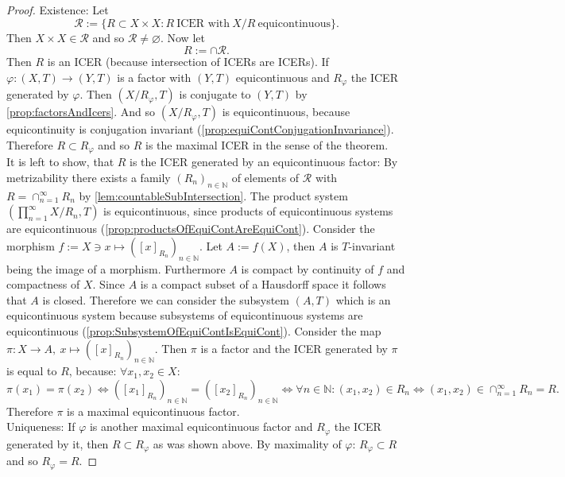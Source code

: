\begin{proof}
  Existence:
  Let
  \begin{equation*}
    \mathcal{R} := \{ R \subset X \times X : R \ \text{ICER with} \ X/R \ \text{equicontinuous}\}.
  \end{equation*}
  Then $ X \times X \in \mathcal{R}$ and so $\mathcal{R} \neq \varnothing$.
    Now let 
  \begin{equation*}
    R:= \cap \mathcal{R}.
  \end{equation*}
  Then $R$ is an ICER (because intersection of ICERs are ICERs).
  If $\varphi : (X,T)\to (Y,T)$ is a factor with $(Y,T)$ equicontinuous and $R_\varphi$ the ICER generated by $\varphi$. Then $(X/R_\varphi,T)$ is conjugate to $(Y,T)$ by \cref{prop:factorsAndIcers}.
  And so $(X/R_\varphi,T)$ is equicontinuous, because equicontinuity is conjugation invariant (\cref{prop:equiContConjugationInvariance}).
  Therefore $R \subset R_\varphi$ and so $R$ is the maximal ICER in the sense of the theorem.\\
  It is left to show, that $R$ is the ICER generated by an equicontinuous factor:
  By metrizability there exists a family $(R_n)_{n\in\mathbb{N}}$ of elements of $\mathcal{R}$ with
  $R = \cap_{n=1}^\infty R_n$ by \cref{lem:countableSubIntersection}.
  The product system $(\prod_{n=1}^\infty X/R_n,T)$ is equicontinuous, since products of equicontinuous systems are equicontinuous (\cref{prop:productsOfEquiContAreEquiCont}).
  Consider the morphism $f:= X \ni x  \mapsto ([x]_{R_n})_{n \in \mathbb{N}}$.
  Let $A:= f(X)$, then $A$ is $T$-invariant being the image of a morphism.
  Furthermore $A$ is compact by continuity of $f$ and compactness of $X$.
  Since $A$ is a compact subset of a Hausdorff space it follows that $A$ is closed.
  Therefore we can consider the subsystem $(A,T)$ which is an equicontinuous system because subsystems of equicontinuous systems are equicontinuous (\cref{prop:SubsystemOfEquiContIsEquiCont}).
  Consider the map $\pi: X \to  A , \  x  \mapsto ([x]_{R_n})_{n \in \mathbb{N}}$.
  Then $\pi$ is a factor and the ICER generated by $\pi$ is equal to $R$, because: $\forall x_1,x_2 \in X$:
  \begin{equation*}
    \pi(x_1) = \pi (x_2) \Leftrightarrow ([x_1]_{R_n})_{n\in \mathbb{N}} = ([x_2]_{R_n})_{n\in \mathbb{N}}
    \Leftrightarrow \forall n \in \mathbb{N} : (x_1, x_2 ) \in R_n
    \Leftrightarrow (x_1,x_2) \in \cap_{n=1}^\infty R_n = R.
  \end{equation*}
  Therefore $\pi$ is a maximal equicontinuous factor.\\
  Uniqueness:
  If $\varphi$ is another maximal equicontinuous factor and $R_\varphi$ the ICER generated by it, then $R \subset R_\varphi$ as was shown above.
  By maximality of $\varphi$: $R_\varphi \subset R$ and so $R_\varphi = R$.
\end{proof}
